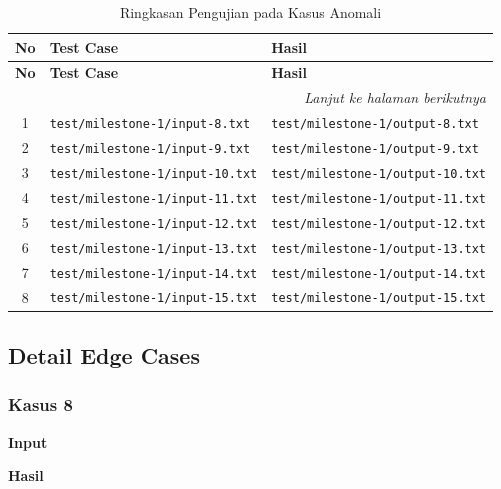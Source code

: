 \begin{longtable}{|c|>{\centering\arraybackslash}m{7cm}|>{\centering\arraybackslash}m{7cm}|}
    \caption{Ringkasan Pengujian pada Kasus Anomali} \label{tab:ringkasan_pengujian_anomali}       \\

    \hline
    \textbf{No} & \textbf{Test Case}                     & \textbf{Hasil}                          \\
    \hline
    \endfirsthead

    \hline
    \textbf{No} & \textbf{Test Case}                     & \textbf{Hasil}                          \\
    \hline
    \endhead

    \hline
    \multicolumn{3}{r}{\textit{Lanjut ke halaman berikutnya}}                                      \\
    \hline
    \endfoot

    \hline
    \endlastfoot

    1           & \texttt{test/milestone-1/input-8.txt}  & \texttt{test/milestone-1/output-8.txt}  \\
    \hline
    2           & \texttt{test/milestone-1/input-9.txt}  & \texttt{test/milestone-1/output-9.txt}  \\
    \hline
    3           & \texttt{test/milestone-1/input-10.txt} & \texttt{test/milestone-1/output-10.txt} \\
    \hline
    4           & \texttt{test/milestone-1/input-11.txt} & \texttt{test/milestone-1/output-11.txt} \\
    \hline
    5           & \texttt{test/milestone-1/input-12.txt} & \texttt{test/milestone-1/output-12.txt} \\
    \hline
    6           & \texttt{test/milestone-1/input-13.txt} & \texttt{test/milestone-1/output-13.txt} \\
    \hline
    7           & \texttt{test/milestone-1/input-14.txt} & \texttt{test/milestone-1/output-14.txt} \\
    \hline
    8           & \texttt{test/milestone-1/input-15.txt} & \texttt{test/milestone-1/output-15.txt} \\
    \hline
\end{longtable}

\subsection*{Detail Edge Cases}

\subsubsection*{Kasus 8}
\textbf{Input}\par

\textbf{Hasil}\par


